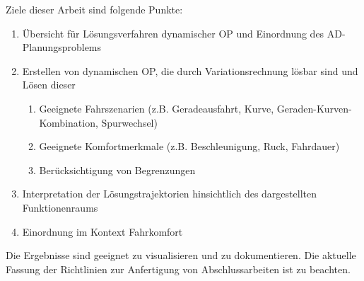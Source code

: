 Ziele dieser Arbeit sind folgende Punkte:
\begin{enumerate}
	\item Übersicht für Lösungsverfahren dynamischer OP und Einordnung des AD-Planungsproblems
	\item Erstellen von dynamischen OP, die durch Variationsrechnung lösbar sind und Lösen dieser
	\begin{enumerate}
		\item Geeignete Fahrszenarien (z.B. Geradeausfahrt, Kurve, Geraden-Kurven-Kombination, Spurwechsel)
		\item Geeignete Komfortmerkmale (z.B. Beschleunigung, Ruck, Fahrdauer)
		\item Berücksichtigung von Begrenzungen
	\end{enumerate}
	\item Interpretation der Lösungstrajektorien hinsichtlich des dargestellten Funktionenraums 
	\item Einordnung im Kontext Fahrkomfort
\end{enumerate}

Die Ergebnisse sind geeignet zu visualisieren und zu dokumentieren. Die aktuelle Fassung der Richtlinien zur Anfertigung von Abschlussarbeiten ist zu beachten.


%
%
%
